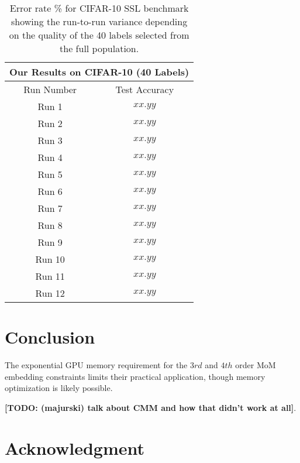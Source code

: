 \documentclass[10pt,twocolumn,letterpaper]{article}
\newcommand{\TODO}[1]{\textbf{\color{red}[TODO: #1]}}
\begin{document}
\begin{table}[htbp]
	\begin{tabular}{c|c}
		\multicolumn{2}{c}{Our Results on CIFAR-10 (40 Labels)}\\
		\hline
		Run Number            & Test Accuracy \\ 
		
		\hline
		Run 1   & $xx.yy$     \\ 
		Run 2      & $xx.yy$    \\
		Run 3   & $xx.yy$ \\
		Run 4    & $xx.yy$ \\
		Run 5    & $xx.yy$ \\ 
		Run 6    & $xx.yy$ \\ 
		Run 7    & $xx.yy$ \\ 
		Run 8    & $xx.yy$ \\ 
		Run 9    & $xx.yy$  \\ 
		Run 10    & $xx.yy$ \\ 
		Run 11   & $xx.yy$ \\ 
		Run 12    & $xx.yy$ \\ 
		
	\end{tabular}
	\caption{Error rate \% for CIFAR-10 SSL benchmark showing the run-to-run variance depending on the quality of the 40 labels selected from the full population.}
	\label{table4}
\end{table}




\section{Conclusion}

The exponential GPU memory requirement for the $3rd$ and $4th$ order MoM embedding constraints limits their practical application, though memory optimization is likely possible.

\TODO{(majurski) talk about CMM and how that didn't work at all}.


\section{Acknowledgment}


{
	\small
	
	
}
\end{document}
